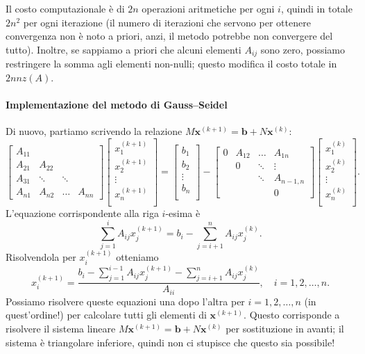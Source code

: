 \documentclass[a4paper]{report}
\theoremstyle{definition}
\theoremstyle{remark}
\newcommand{\x}{\mathbf{x}}
\renewcommand{\b}{\mathbf{b}}
\begin{document}
Il costo computazionale è di $2n$ operazioni aritmetiche per ogni $i$, quindi in totale $2n^2$ per ogni iterazione (il numero di iterazioni che servono per ottenere convergenza non è noto a priori, anzi, il metodo potrebbe non convergere del tutto). Inoltre, se
 sappiamo a priori che alcuni elementi $A_{ij}$ sono zero, possiamo restringere la somma agli elementi non-nulli; questo modifica il costo totale in $2nnz(A)$.

\paragraph{Implementazione del metodo di Gauss--Seidel}

Di nuovo, partiamo scrivendo la relazione $M\x^{(k+1)} = \b + N\x^{(k)}$:
\[
\begin{bmatrix}
    A_{11}\\
    A_{21} & A_{22}\\
    A_{31}& \ddots & \ddots \\
    A_{n1}& A_{n2} &\dots & A_{nn}
\end{bmatrix}
\begin{bmatrix}
    x_1^{(k+1)}\\
    x_2^{(k+1)}\\
    \vdots\\
    x_n^{(k+1)}\\
\end{bmatrix}
=
\begin{bmatrix}
    b_1\\
    b_2\\
    \vdots\\
    b_n\\
\end{bmatrix}
-
\begin{bmatrix}
     0& A_{12} & \dots & A_{1n}\\
     & 0 & \ddots & \vdots\\
     &  & \ddots & A_{n-1,n}\\
     & &  & 0
\end{bmatrix}
\begin{bmatrix}
    x_1^{(k)}\\
    x_2^{(k)}\\
    \vdots \\
    x_n^{(k)}\\
\end{bmatrix}.
\]
L'equazione corrispondente alla riga $i$-esima è
\[
\sum_{j=1}^i A_{ij}x_j^{(k+1)} = b_i - \sum_{j=i+1}^n A_{ij}x_j^{(k)}. 
\]
Risolvendola per $x_{i}^{(k+1)}$ otteniamo
\begin{equation} \label{GS}
    x_{i}^{(k+1)} = \frac{b_i - \sum_{j=1}^{i-1} A_{ij}x_j^{(k+1)} - \sum_{j=i+1}^n A_{ij}x_j^{(k)} }{A_{ii}}, \quad i=1,2,\dots,n.
\end{equation}
Possiamo risolvere queste equazioni una dopo l'altra per $i=1,2,\dots,n$ (in quest'ordine!) per calcolare tutti gli elementi di $\x^{(k+1)}$. Questo corrisponde a risolvere il sistema lineare $M\x^{(k+1)} = \b + N\x^{(k)}$ per sostituzione in avanti; il sistema è triangolare inferiore, quindi non ci stupisce che questo sia possibile!
\end{document}
